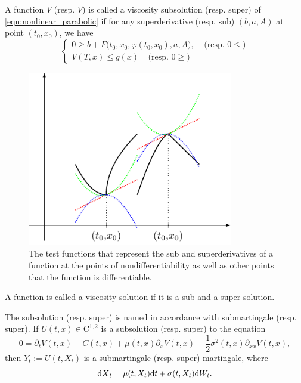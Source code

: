 \documentclass[11pt]{book}
\newcommand{\dt}{\text{\normalfont d}t}
\newcommand{\dX}{\text{\normalfont d}X}
\newcommand{\dW}{\text{\normalfont d}W}
\begin{document}
A function $\underline{V}$ (resp. $\overline{V}$) is called a viscosity subsolution (resp. super) of \eqref{eqn:nonlinear_parabolic} if for any superderivative (resp. sub) $(b,a,A)$ at point $(t_0,x_0)$, we have 
\begin{equation}
\begin{cases}		0\ge b+F\big(t_0,x_0,\varphi(t_0,x_0),a,A\big), ~~~~~\textrm{(resp. $0\le $)}\\
		V(T,x)\le g(x) ~~~~~\textrm{(resp. $0\ge $)}
\end{cases}
\end{equation}


\begin{figure}[ht!]
\centering
\includegraphics[width=0.8\textwidth]{Figs/viscosity}
\caption{The test functions that represent the sub and superderivatives of a function at the points of nondifferentiability as well as other points that the function is differentiable.}
\label{fig:viscosity}
\end{figure}
A function is called a viscosity solution if it is a sub and a super solution. 

\begin{rem}
The subsolution (resp. super) is named in accordance with submartingale (resp. super). If $U(t,x)\in\mathrm{C}^{1,2}$ is a subsolution (resp. super) to the equation 
\begin{equation}
		0=\partial_{t}V(t,x)+C(t,x)+\mu(t,x)\partial_{x}V(t,x)+\frac12{\sigma^2(t,x)}\partial_{xx}V(t,x),
\end{equation}
then $Y_t:=U(t,X_t)$ is a submartingale (resp. super) martingale, where
\begin{equation}
{\dX}_t=\mu(t,X_t){{\dt}}+\sigma(t,X_t)\dW_t.
\end{equation}
\end{rem}
\end{document}
